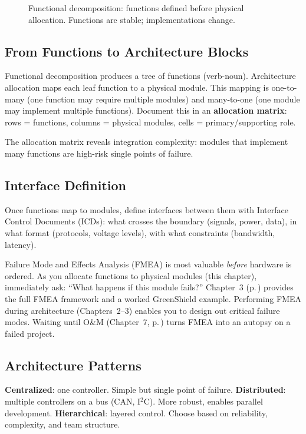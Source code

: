 \begin{figure}[htbp]\centering

\caption{Functional decomposition: functions defined before physical allocation. Functions are stable; implementations change.}\label{fig:func}
\end{figure}


\subsection{From Functions to Architecture Blocks}
Functional decomposition produces a tree of functions (verb-noun). Architecture allocation maps each leaf function to a physical module. This mapping is one-to-many (one function may require multiple modules) and many-to-one (one module may implement multiple functions). Document this in an \textbf{allocation matrix}: rows = functions, columns = physical modules, cells = primary/supporting role.

The allocation matrix reveals integration complexity: modules that implement many functions are high-risk single points of failure.


\subsection{Interface Definition}
Once functions map to modules, define interfaces between them with Interface Control Documents (ICDs): what crosses the boundary (signals, power, data), in what format (protocols, voltage levels), with what constraints (bandwidth, latency).


\begin{keyconceptbox}
Failure Mode and Effects Analysis (FMEA) is most valuable \emph{before} hardware is ordered. As you allocate functions to physical modules (this chapter), immediately ask: ``What happens if this module fails?'' Chapter~3 (p.\,\pageref{ch:requirements}) provides the full FMEA framework and a worked GreenShield example. Performing FMEA during architecture (Chapters~2--3) enables you to design out critical failure modes. Waiting until O\&M (Chapter~7, p.\,\pageref{ch:oandm}) turns FMEA into an autopsy on a failed project.
\end{keyconceptbox}

\subsection{Architecture Patterns}
\textbf{Centralized}: one controller. Simple but single point of failure. \textbf{Distributed}: multiple controllers on a bus (CAN, I$^2$C). More robust, enables parallel development. \textbf{Hierarchical}: layered control. Choose based on reliability, complexity, and team structure.


